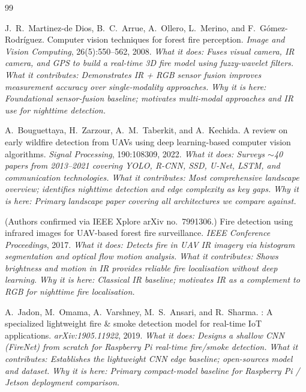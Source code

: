 \documentclass[11pt,twocolumn]{article}
\begin{document}
\begin{thebibliography}{99}

J.~R.~Martinez-de Dios, B.~C.~Arrue, A.~Ollero, L.~Merino, and
F.~G\'{o}mez-Rodr\'{i}guez.
\newblock Computer vision techniques for forest fire perception.
\newblock \textit{Image and Vision Computing}, 26(5):550--562, 2008.
\newblock \textit{What it does: Fuses visual camera, IR camera, and GPS
to build a real-time 3D fire model using fuzzy-wavelet filters.}
\newblock \textit{What it contributes: Demonstrates IR + RGB sensor
fusion improves measurement accuracy over single-modality approaches.}
\newblock \textit{Why it is here: Foundational sensor-fusion baseline;
motivates multi-modal approaches and IR use for nighttime detection.}

A.~Bouguettaya, H.~Zarzour, A.~M.~Taberkit, and A.~Kechida.
\newblock A review on early wildfire detection from UAVs using deep
learning-based computer vision algorithms.
\newblock \textit{Signal Processing}, 190:108309, 2022.
\newblock \textit{What it does: Surveys $\sim$40 papers from 2013--2021
covering YOLO, R-CNN, SSD, U-Net, LSTM, and communication technologies.}
\newblock \textit{What it contributes: Most comprehensive landscape
overview; identifies nighttime detection and edge complexity as key gaps.}
\newblock \textit{Why it is here: Primary landscape paper covering all
architectures we compare against.}

(Authors confirmed via IEEE Xplore arXiv no.~7991306.)
\newblock Fire detection using infrared images for UAV-based forest fire
surveillance.
\newblock \textit{IEEE Conference Proceedings}, 2017.
\newblock \textit{What it does: Detects fire in UAV IR imagery via
histogram segmentation and optical flow motion analysis.}
\newblock \textit{What it contributes: Shows brightness and motion in IR
provides reliable fire localisation without deep learning.}
\newblock \textit{Why it is here: Classical IR baseline; motivates IR
as a complement to RGB for nighttime fire localisation.}

A.~Jadon, M.~Omama, A.~Varshney, M.~S.~Ansari, and R.~Sharma.
: A specialized lightweight fire \& smoke detection
model for real-time {IoT} applications.
\newblock \textit{arXiv:1905.11922}, 2019.
\newblock \textit{What it does: Designs a shallow CNN (FireNet) from
scratch for Raspberry Pi real-time fire/smoke detection.}
\newblock \textit{What it contributes: Establishes the lightweight CNN
edge baseline; open-sources model and dataset.}
\newblock \textit{Why it is here: Primary compact-model baseline for
Raspberry Pi / Jetson deployment comparison.}


\end{thebibliography}
\end{document}
